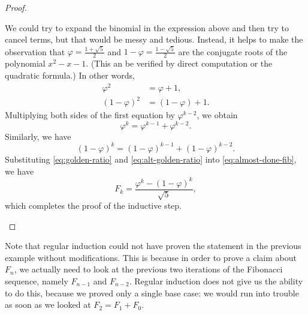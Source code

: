 \documentclass[../notes.tex]{subfiles}
\begin{document}
\begin{proof}
\begin{enumerate}
        We could try to expand the binomial in the expression above and then try to cancel terms, but that would be messy and tedious. Instead, it helps to make the observation that $\varphi=\frac{1+\sqrt5}2$ and $1 - \varphi=\frac{1-\sqrt5}2$ are the conjugate roots of the polynomial $x^2 - x - 1$. (This an be verified by direct computation or the quadratic formula.) In other words,
        \begin{align*}
            \varphi^2 &= \varphi + 1,\\
            (1 - \varphi)^2 &= (1 - \varphi) + 1.
        \end{align*}
        Multiplying both sides of the first equation by $\varphi^{k - 2}$, we obtain
        \begin{equation}
            \varphi^k = \varphi^{k - 1} + \varphi^{k - 2}. \label{eq:golden-ratio}
        \end{equation}
        Similarly, we have
        \begin{equation}
            (1 - \varphi)^k = (1 - \varphi)^{k - 1} + (1 - \varphi)^{k - 2}. \label{eq:alt-golden-ratio}
        \end{equation}
        Substituting \autoref{eq:golden-ratio} and \autoref{eq:alt-golden-ratio} into \autoref{eq:almost-done-fib}, we have
        \[F_k = \frac{\varphi^k - (1 - \varphi)^k}{\sqrt{5}},\]
        which completes the proof of the inductive step.
        \qedhere
    \end{enumerate}
\end{proof}
Note that regular induction could not have proven the statement in the previous example without modifications. This is because in order to prove a claim about $F_n$, we actually need to look at the previous two iterations of the Fibonacci sequence, namely $F_{n-1}$ and $F_{n - 2}$. Regular induction does not give us the ability to do this, because we proved only a single base case: we would run into trouble as soon as we looked at $F_2 = F_1 + F_0$.
\end{document}
